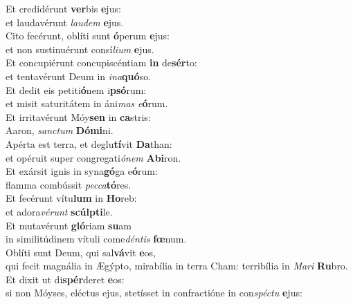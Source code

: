 \oddverse Et credidérunt \textbf{ver}bis \textbf{e}jus:~\*\\
\oddverse et laudavérunt \textit{lau}\textit{dem} \textbf{e}jus.\\
\evenverse Cito fecérunt, oblíti sunt \textbf{ó}perum \textbf{e}jus:~\*\\
\evenverse et non sustinuérunt consí\textit{li}\textit{um} \textbf{e}jus.\\
\oddverse Et concupiérunt concupiscéntiam \textbf{in} de\textbf{sér}to:~\*\\
\oddverse et tentavérunt Deum in \textit{i}\textit{na}\textbf{quó}so.\\
\evenverse Et dedit eis petiti\textbf{ó}nem i\textbf{psó}rum:~\*\\
\evenverse et misit saturitátem in áni\textit{mas} \textit{e}\textbf{ó}rum.\\
\oddverse Et irritavérunt Móy\textbf{sen} in \textbf{ca}stris:~\*\\
\oddverse Aaron, \textit{san}\textit{ctum} \textbf{Dó}\textbf{mi}ni.\\
\evenverse Apérta est terra, et deglu\textbf{tí}vit \textbf{Da}than:~\*\\
\evenverse et opéruit super congregati\textit{ó}\textit{nem} \textbf{A}\textbf{bi}ron.\\
\oddverse Et exársit ignis in syna\textbf{gó}ga e\textbf{ó}rum:~\*\\
\oddverse flamma combússit \textit{pec}\textit{ca}\textbf{tó}res.\\
\evenverse Et fecérunt vítu\textbf{lum} in \textbf{Ho}reb:~\*\\
\evenverse et adora\textit{vé}\textit{runt} \textbf{scúl}\textbf{pti}le.\\
\oddverse Et mutavérunt \textbf{gló}riam \textbf{su}am~\*\\
\oddverse in similitúdinem vítuli come\textit{dén}\textit{tis} \textbf{fœ}num.\\
\evenverse Oblíti sunt Deum, qui sal\textbf{vá}vit \textbf{e}os,~\*\\
\evenverse qui fecit magnália in Ægýpto, mirabília in terra Cham: terribília in \textit{Ma}\textit{ri} \textbf{Ru}bro.\\
\oddverse Et dixit ut di\textbf{spér}deret \textbf{e}os:~\*\\
\oddverse si non Móyses, eléctus ejus, stetísset in confractióne in con\textit{spé}\textit{ctu} \textbf{e}jus:\\

